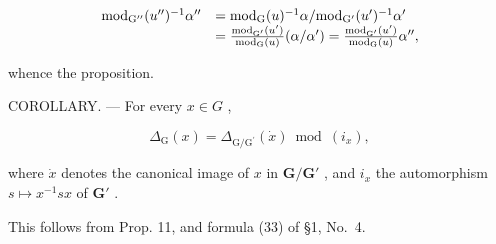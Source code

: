 \[
\begin{array}{r l} \mathrm{mod} _ {\mathrm{G} ^ {\prime \prime}} (u ^ {\prime \prime}) ^ {- 1} \alpha^ {\prime \prime} & = \mathrm{mod} _ {\mathrm{G}} (u) ^ {- 1} \alpha / \mathrm{mod} _ {\mathrm{G} ^ {\prime}} (u ^ {\prime}) ^ {- 1} \alpha^ {\prime} \\ & = \frac {\mathrm{mod} _ {\mathrm{G} ^ {\prime}} (u ^ {\prime})}{\mathrm{mod} _ {\mathrm{G}} (u)} (\alpha / \alpha^ {\prime}) = \frac {\mathrm{mod} _ {\mathrm{G} ^ {\prime}} (u ^ {\prime})}{\mathrm{mod} _ {\mathrm{G}} (u)} \alpha^ {\prime \prime}, \end{array}
\]

whence the proposition.

COROLLARY. --- For every \(x \in G\) ,

\[
\Delta_ {\mathrm{G}} (x) = \Delta_ {\mathrm{G} / \mathrm{G} ^ {\prime}} (\dot {x}) \bmod (i _ {x}),
\]

where \(\dot{x}\) denotes the canonical image of \(x\) in \(\mathbf{G} / \mathbf{G}'\) , and \(i_x\) the automorphism \(s \mapsto x^{-1}sx\) of \(\mathbf{G}'\) .

This follows from Prop. 11, and formula (33) of §1, No.~4.

